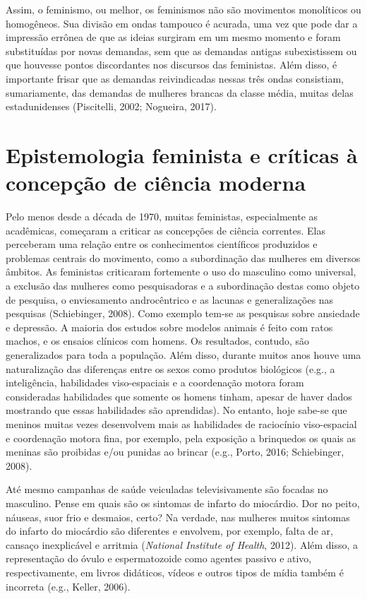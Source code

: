 Assim, o feminismo, ou melhor, os feminismos não são movimentos monolíticos ou homogêneos. Sua divisão em ondas tampouco é acurada, uma vez que pode dar a impressão errônea de que as ideias surgiram em um mesmo momento e foram substituídas por novas demandas, sem que as demandas antigas subexistissem ou que houvesse pontos discordantes nos discursos das feministas. Além disso, é importante frisar que as demandas reivindicadas nessas três ondas consistiam, sumariamente, das demandas de mulheres brancas da classe média, muitas delas estadunidenses (Piscitelli, 2002; Nogueira, 2017).
\vfill

\section*{Epistemologia feminista e críticas à concepção de ciência moderna}

Pelo menos desde a década de 1970, muitas feministas, especialmente as acadêmicas, começaram a criticar as concepções de ciência correntes. Elas perceberam uma relação entre os conhecimentos científicos produzidos e problemas centrais do movimento, como a subordinação das mulheres em diversos âmbitos. As feministas criticaram fortemente o uso do masculino como universal, a exclusão das mulheres como pesquisadoras e a subordinação destas como objeto de pesquisa, o enviesamento androcêntrico e as lacunas e generalizações nas pesquisas (Schiebinger, 2008). Como exemplo tem-se as pesquisas sobre ansiedade e depressão. A maioria dos estudos sobre modelos animais é feito com ratos machos, e os ensaios clínicos com homens. Os resultados, contudo, são generalizados para toda a população. Além disso, durante muitos anos houve uma naturalização das diferenças entre os sexos como produtos biológicos (e.g., a inteligência, habilidades viso-espaciais e a coordenação motora foram consideradas habilidades que somente os homens tinham, apesar de haver dados mostrando que essas habilidades são aprendidas). No entanto, hoje sabe-se que meninos muitas vezes desenvolvem mais as habilidades de raciocínio viso-espacial e coordenação motora fina, por exemplo, pela exposição a brinquedos os quais as meninas são proibidas e/ou punidas ao brincar (e.g., Porto, 2016; Schiebinger, 2008).

Até mesmo campanhas de saúde veiculadas televisivamente são focadas no masculino. Pense em quais são os sintomas de infarto do miocárdio. Dor no peito, náuseas, suor frio e desmaios, certo? Na verdade, nas mulheres muitos sintomas do infarto do miocárdio são diferentes e envolvem, por exemplo, falta de ar, cansaço inexplicável e arritmia (\textit{National Institute of Health}, 2012). Além disso, a representação do óvulo e espermatozoide como agentes passivo e ativo, respectivamente, em livros didáticos, vídeos e outros tipos de mídia também é incorreta (e.g., Keller, 2006).

